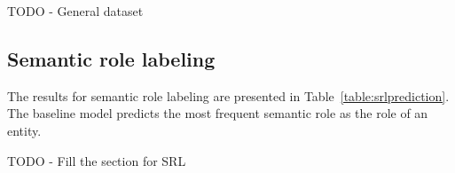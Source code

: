 TODO - General dataset

\subsection{Semantic role labeling}
The results for semantic role labeling are presented in Table~\ref{table:srlprediction}. The baseline model predicts the most frequent semantic role as the role of an entity.

TODO - Fill the section for SRL
